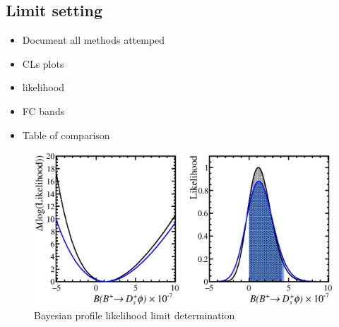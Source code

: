 {%
 
 


\subsection{Limit setting}
\label{sec:B2DsPhi_limitsetting}

{\color{Red}
\begin{itemize}
\item Document all methods attemped
\item CLs plots
\item likelihood
\item FC bands
\item Table of comparison 
\end{itemize}
}

\begin{figure}[!h]
    \centering
        \includegraphics[width=1.0\textwidth]{figs/B2DsPhi/Likelihood_limits.eps}
        \caption{Bayesian profile likelihood limit determination}
    \label{fig:limit_likelihood}   
\end{figure}

}
